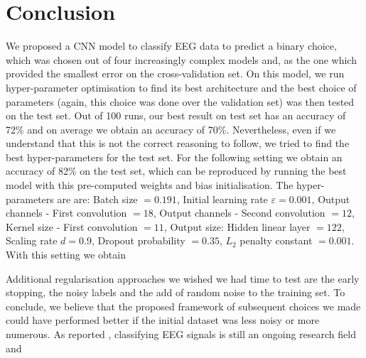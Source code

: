 \documentclass{article}
\begin{document}
 \section{Conclusion}\label{sec_conclusion}
 We proposed a CNN model to classify  EEG data to predict a binary choice, which was chosen out of four  increasingly complex models and, as  the one which provided the smallest error on the cross-validation set. 
 On this model, we run hyper-parameter optimisation to find its best architecture and the best choice of parameters (again, this choice was done over the validation set) was then tested on the test set. 
 Out of 100 runs, our best result on test set has an accuracy of 72\% and on average we obtain an accuracy of 70\%. 
 Nevertheless,  even if we understand that this is not the correct reasoning to follow, we tried to find the best hyper-parameters for the test set.  For the following setting we obtain an accuracy of 82\% on the test set, which can be reproduced by running the best model with this pre-computed weights and bias initialisation. 
 The hyper-parameters are are:
 Batch size $ =  0.191$,  Initial learning rate $\varepsilon  = 0.001$,  Output channels - First convolution  $= 18$, Output channels - Second convolution $= 12$, Kernel size - First convolution $= 11$, Output size: Hidden linear layer $ = 122$,  Scaling rate $d = 0.9$, Dropout probability $=  0.35$,  $L_2$ penalty constant $=0.001$.
With this setting we obtain  
 
 Additional regularisation approaches we wished  we had time to test are  the early stopping, the noisy labels and the add of random noise to the training set. 
 To conclude, we believe that the proposed framework of subsequent choices we made could have performed better if the initial dataset was less noisy or more numerous. 
 As reported \cite{bci_qualcosa}, classifying EEG signals is still an ongoing research field and 
 
 
 

 
  
  
  
\end{document}

